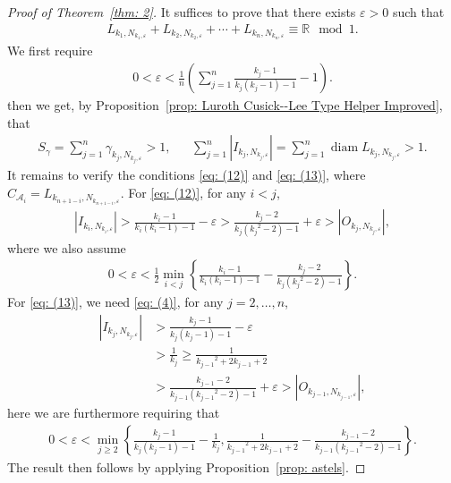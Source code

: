 \documentclass{ws-ijnt}
\begin{document}
	\begin{proof}[Proof of Theorem~\ref{thm: 2}]
		It suffices to prove that there exists $\varepsilon>0$ such that
		\begin{align*}
			L_{k_1,N_{k_1,\varepsilon}}+
			L_{k_2,N_{k_2,\varepsilon}}+\cdots+
			L_{k_n,N_{k_n,\varepsilon}}\equiv\mathbb{R}\mod1.
		\end{align*}
		We first require
		\begin{align*}
			0<\varepsilon<\frac{1}{n}\left(\sum_{j=1}^{n}\frac{k_j-1}{k_j(k_j-1)-1}-1\right).
		\end{align*}
		then we get, by Proposition~\ref{prop: Luroth Cusick--Lee Type Helper Improved}, that
		\begin{align*}
			S_{\gamma}
			=\sum_{j=1}^n\gamma_{k_j,N_{k_j,\varepsilon}}>1, &&
			\sum_{j=1}^n\left\lvert I_{k_j,N_{k_j,\varepsilon}}\right\rvert=\sum_{j=1}^n\operatorname{diam}{L_{k_j,N_{k_j,\varepsilon}}}>1
			.
		\end{align*}
		It remains to verify the conditions \eqref{eq: (12)} and \eqref{eq: (13)}, where $C_{\mathcal{A}_i}=L_{k_{n+1-i},N_{k_{n+1-i},\varepsilon}}$. For \eqref{eq: (12)}, for any $i<j$,
		\begin{align*}
			\left\lvert{I_{k_i,N_{k_i,\varepsilon}}}\right\rvert
			>\frac{k_i-1}{k_i(k_i-1)-1}-\varepsilon
			>\frac{k_j-2}{k_j({k_j}^2-2)-1}+\varepsilon
			>
			\left\lvert{O_{k_j,N_{k_j,\varepsilon}}}\right\rvert
			,
		\end{align*}
		where we also assume
		\begin{align*}
			0
			<\varepsilon
			<\frac{1}{2}\min_{i<j}{\left\{\frac{k_i-1}{k_i(k_i-1)-1}-\frac{k_j-2}{k_j({k_j}^2-2)-1}\right\}}
			.
		\end{align*}
		For \eqref{eq: (13)}, we need \eqref{eq: (4)}, for any $j=2,\dots,n$,
		\begin{align*}
			\left\lvert{I_{k_j,N_{k_j,\varepsilon}}}\right\rvert
			&>\frac{k_j-1}{k_j(k_j-1)-1}-\varepsilon \\
			&>\frac{1}{k_j}
			\geq\frac{1}{{{k_{j-1}}^2+2k_{j-1}+2}} \\
			&>\frac{k_{j-1}-2}{k_{j-1}({k_{j-1}}^2-2)-1}+\varepsilon
			>
			\left\lvert{O_{k_{j-1},N_{k_{j-1},\varepsilon}}}\right\rvert
			,
		\end{align*}
		here we are furthermore requiring that
		\begin{align*}
			0<\varepsilon
			<\min_{j\geq2}\left\{\frac{k_j-1}{k_j(k_j-1)-1}-\frac{1}{k_j},\frac{1}{{{k_{j-1}}^2+2k_{j-1}+2}}-\frac{k_{j-1}-2}{k_{j-1}({k_{j-1}}^2-2)-1}\right\}
			.
		\end{align*}
		The result then follows by applying Proposition~\ref{prop: astels}.
	\end{proof}
	
\end{document}
